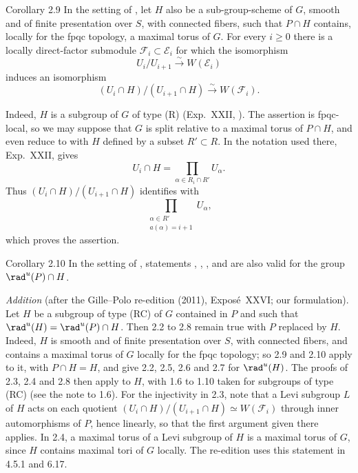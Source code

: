 \begin{sgastatement}{Corollary 2.9}
In the setting of , let \(H\) also be a sub-group-scheme of \(G\),
smooth and of finite presentation over \(S\), with connected fibers, such
that \(P\cap H\) contains, locally for the fpqc topology, a maximal torus
of \(G\).  For every \(i\geq0\) there is a locally direct-factor
submodule \(\mathcal F_i\subset\mathcal E_i\) for which the isomorphism
\[
 U_i/U_{i+1}\xrightarrow{\sim}W(\mathcal E_i)
\]
induces an isomorphism
\[
 (U_i\cap H)/(U_{i+1}\cap H)\xrightarrow{\sim}W(\mathcal F_i).
\]
\end{sgastatement}

Indeed, \(H\) is a subgroup of \(G\) of type (R) (Exp.\ XXII, ).
The assertion is fpqc-local, so we may suppose that \(G\) is split
relative to a maximal torus of \(P\cap H\), and even reduce to  with
\(H\) defined by a subset \(R'\subset R\).  In the notation used there,
Exp.\ XXII,  gives
\[
 U_i\cap H=\prod_{\alpha\in R_i\cap R'}U_\alpha.
\]
Thus \((U_i\cap H)/(U_{i+1}\cap H)\) identifies with
\[
 \prod_{\substack{\alpha\in R'\\a(\alpha)=i+1}}U_\alpha,
\]
which proves the assertion.

\begin{sgastatement}{Corollary 2.10}
In the setting of , statements , , , and  are
also valid for the group \(\rad^u(P)\cap H\).
\end{sgastatement}

\emph{Addition} (after the Gille--Polo re-edition (2011), Exposé~XXVI; our
formulation).  Let \(H\) be a subgroup of type (RC) of \(G\) contained in
\(P\) and such that \(\rad^u(H)=\rad^u(P)\cap H\). Then 2.2 to 2.8 remain
true with \(P\) replaced by \(H\). Indeed, \(H\) is smooth and of finite
presentation over \(S\), with connected fibers, and contains a maximal torus
of \(G\) locally for the fpqc topology; so 2.9 and 2.10 apply to it, with
\(P\cap H=H\), and give 2.2, 2.5, 2.6 and 2.7 for \(\rad^u(H)\). The proofs
of 2.3, 2.4 and 2.8 then apply to \(H\), with 1.6 to 1.10 taken for subgroups
of type (RC) (see the note to 1.6). For the injectivity in 2.3, note that a
Levi subgroup \(L\) of \(H\) acts on each quotient
\((U_i\cap H)/(U_{i+1}\cap H)\simeq W(\mathcal F_i)\) through inner
automorphisms of \(P\), hence linearly, so that the first argument given
there applies. In 2.4, a maximal torus of a Levi subgroup of \(H\) is a
maximal torus of \(G\), since \(H\) contains maximal tori of \(G\) locally.
The re-edition uses this statement in 4.5.1 and 6.17.

